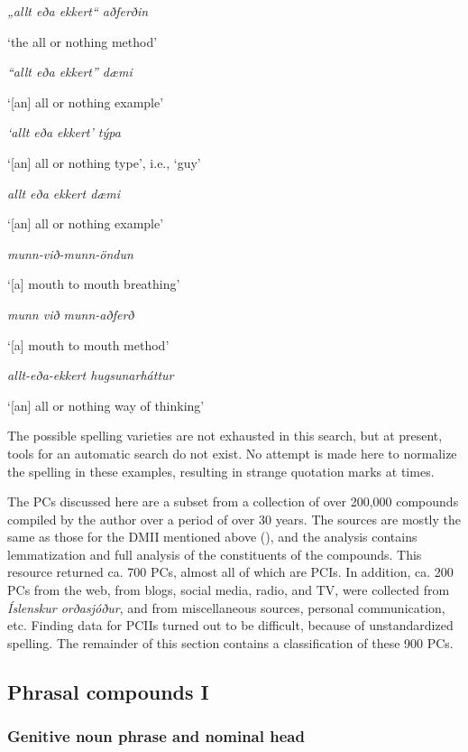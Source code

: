 \documentclass[output=paper]{LSP/langsci}
\begin{document}
\begin{xlist}

\ea%
 \label{ex:bjarnadottir:14} 
\ea \label{ex:bjarnadottir:14a} \parbox{5cm}{\textit{„allt eða ekkert“ aðferðin}} ‘the all or nothing method’
\ex \label{ex:bjarnadottir:14b} \parbox{5cm}{\textit{“allt eða ekkert” dæmi}} ‘[an] all or nothing example’
\ex \label{ex:bjarnadottir:14c} \parbox{5cm}{\textit{‘allt eða ekkert’ týpa}} ‘[an] all or nothing type’, i.e., ‘guy’
\ex \label{ex:bjarnadottir:14d} \parbox{5cm}{\textit{allt eða ekkert dæmi}} ‘[an] all or nothing example’
\ex \label{ex:bjarnadottir:14e} \parbox{5cm}{\textit{munn-við-munn-öndun}} ‘[a] mouth to mouth breathing’
\ex \label{ex:bjarnadottir:14f} \parbox{5cm}{\textit{munn við munn-aðferð}} ‘[a] mouth to mouth method’
\ex \label{ex:bjarnadottir:14g} \parbox{5cm}{\textit{allt-eða-ekkert hugsunarháttur}}  ‘[an] all or nothing way of thinking’
\z
\z

The possible spelling varieties are not exhausted in this search, but at present, tools for an automatic search do not exist. No attempt is made here to normalize the spelling in these examples, resulting in strange quotation marks at times.

The PCs discussed here are a subset from a collection of over 200,000 compounds compiled by the author over a period of over 30 years. The sources are mostly the same as those for the DMII mentioned above (\citealt{Bjarnadóttir19962005,Bjarnadóttir2012}), and the analysis contains lemmatization and full analysis of the con\-stit\-u\-ents of the compounds. This resource returned ca. 700 PCs, almost all of which are PCIs. In addition, ca. 200 PCs from the web, from blogs, social media, radio, and TV, were collected from \textit{Íslenskur orðasjóður}, and from miscellaneous sources, personal communication, etc. Finding data for PCIIs turned out to be difficult, because of unstandardized spelling. The remainder of this section contains a classification of these 900 PCs.

\subsection{Phrasal compounds I}\label{sec:bjarnadottir:3.1}

\subsubsection{Genitive noun phrase and nominal head}\label{sec:bjarnadottir:3.1.1}


\end{xlist}
\end{document}
